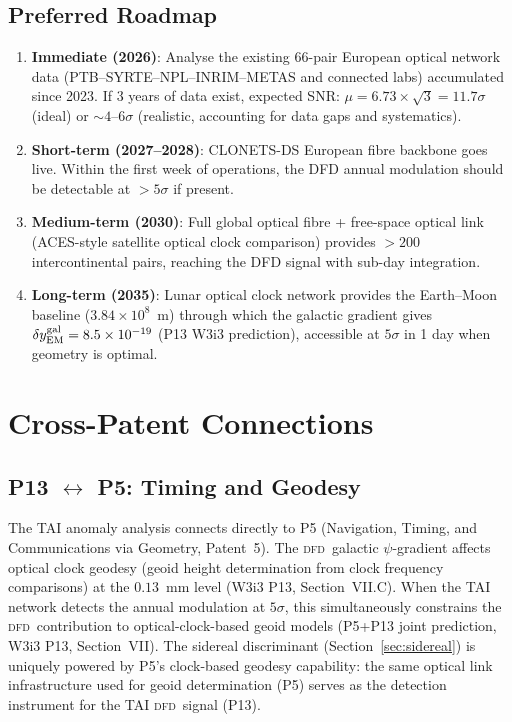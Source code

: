\documentclass[aps,prd,twocolumn,superscriptaddress,nofootinbib]{revtex4-2}
\newcommand{\DFD}{\textsc{dfd}}
\begin{document}
\subsection{Preferred Roadmap}

\begin{enumerate}
\item \textbf{Immediate (2026)}: Analyse the existing 66-pair European optical
      network data (PTB--SYRTE--NPL--INRIM--METAS and connected labs)
      accumulated since 2023. If 3 years of data exist, expected SNR:
      $\mu = 6.73\times\sqrt{3} = 11.7\sigma$ (ideal) or $\sim 4$--$6\sigma$
      (realistic, accounting for data gaps and systematics).

\item \textbf{Short-term (2027--2028)}: CLONETS-DS European fibre backbone
      goes live. Within the first week of operations, the DFD annual
      modulation should be detectable at $>5\sigma$ if present.

\item \textbf{Medium-term (2030)}: Full global optical fibre + free-space
      optical link (ACES-style satellite optical clock comparison) provides
      $>200$ intercontinental pairs, reaching the DFD signal with sub-day
      integration.

\item \textbf{Long-term (2035)}: Lunar optical clock network provides the
      Earth--Moon baseline ($3.84\times10^8$~m) through which the galactic
      gradient gives $\delta y_{\rm EM}^{\rm gal} = 8.5\times10^{-19}$
      (P13 W3i3 prediction), accessible at $5\sigma$ in 1 day when
      geometry is optimal.
\end{enumerate}

\section{Cross-Patent Connections}
\label{sec:cross_patent}

\subsection{P13 $\leftrightarrow$ P5: Timing and Geodesy}

The TAI anomaly analysis connects directly to P5 (Navigation, Timing,
and Communications via Geometry, Patent~5). The \DFD\ galactic $\psi$-gradient
affects optical clock geodesy (geoid height determination from clock
frequency comparisons) at the $0.13$~mm level (W3i3 P13,
Section~VII.C). When the TAI network detects the annual modulation at
$5\sigma$, this simultaneously constrains the \DFD\ contribution to
optical-clock-based geoid models (P5+P13 joint prediction, W3i3 P13,
Section~VII). The sidereal discriminant (Section~\ref{sec:sidereal})
is uniquely powered by P5's clock-based geodesy capability:
the same optical link infrastructure used for geoid determination (P5)
serves as the detection instrument for the TAI \DFD\ signal (P13).
\end{document}

